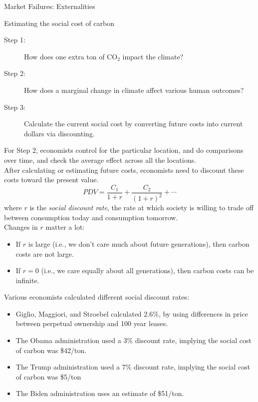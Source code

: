 \documentclass[10pt]{extarticle}
\begin{document}
\begin{problem}{Market Failures: Externalities}
\begin{problem}{Estimating the social cost of carbon}
\begin{description}
        \item[Step 1:] How does one extra ton of CO$_2$ impact the climate?
        \item[Step 2:] How does a marginal change in climate affect various human outcomes?
        \item[Step 3:] Calculate the current social cost by converting future costs into current dollars via discounting.
      \end{description}
      For Step 2, economists control for the particular location, and do comparisons over time, and check the average effect across all the locations.\\

      After calculating or estimating future costs, economists need to discount these costs toward the present value.
      \[
        PDV = \frac{C_1}{1+r} + \frac{C_2}{(1+r)^2} + \cdots
      \] 
      where $r$ is the \textit{social discount rate}, the rate at which society is willing to trade off between consumption today and consumption tomorrow.\\

      Changes in $r$ matter a lot:
      \begin{itemize}
        \item If $r$ is large (i.e., we don't care much about future generations), then carbon costs are not large.
        \item If $r = 0$ (i.e., we care equally about all generations), then carbon costs can be infinite.
      \end{itemize}
      Various economists calculated different social discount rates:
      \begin{itemize}
        \item Giglio, Maggiori, and Stroebel calculated $2.6\%$, by using differences in price between perpetual ownership and 100 year leases.
        \item The Obama administration used a 3\% discount rate, implying the social cost of carbon was \$42/ton.
        \item The Trump administration used a 7\% discount rate, implying the social cost of carbon was \$5/ton
        \item The Biden administration uses an estimate of \$51/ton.
      \end{itemize}
    \end{problem}
  \end{problem}
\end{document}
